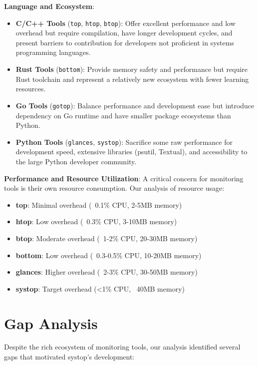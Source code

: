 \documentclass[12pt,a4paper,oneside]{report}
\begin{document}
\textbf{Language and Ecosystem}:
\begin{itemize}
    \item \textbf{C/C++ Tools} (\texttt{top}, \texttt{htop}, \texttt{btop}): Offer excellent performance and low overhead but require compilation, have longer development cycles, and present barriers to contribution for developers not proficient in systems programming languages.
    \item \textbf{Rust Tools} (\texttt{bottom}): Provide memory safety and performance but require Rust toolchain and represent a relatively new ecosystem with fewer learning resources.
    \item \textbf{Go Tools} (\texttt{gotop}): Balance performance and development ease but introduce dependency on Go runtime and have smaller package ecosystems than Python.
    \item \textbf{Python Tools} (\texttt{glances}, \texttt{systop}): Sacrifice some raw performance for development speed, extensive libraries (psutil, Textual), and accessibility to the large Python developer community.
\end{itemize}

\textbf{Performance and Resource Utilization}: A critical concern for monitoring tools is their own resource consumption. Our analysis of resource usage:

\begin{itemize}
    \item \textbf{top}: Minimal overhead (~0.1\% CPU, 2-5MB memory)
    \item \textbf{htop}: Low overhead (~0.3\% CPU, 3-10MB memory)
    \item \textbf{btop}: Moderate overhead (~1-2\% CPU, 20-30MB memory)
    \item \textbf{bottom}: Low overhead (~0.3-0.5\% CPU, 10-20MB memory)
    \item \textbf{glances}: Higher overhead (~2-3\% CPU, 30-50MB memory)
    \item \textbf{systop}: Target overhead (<1\% CPU, ~40MB memory)
\end{itemize}

\section{Gap Analysis}
\label{sec:gap-analysis}

Despite the rich ecosystem of monitoring tools, our analysis identified several gaps that motivated systop's development:
\end{document}
